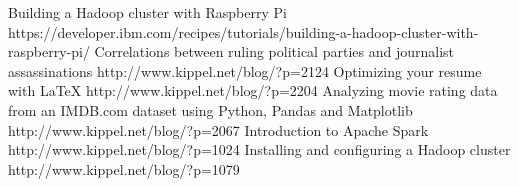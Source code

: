 %
%
%


\begin{publications}
    \publication
        {Building a Hadoop cluster with Raspberry Pi}
        {https://developer.ibm.com/recipes/tutorials/building-a-hadoop-cluster-with-raspberry-pi/}
    \publication
        {Correlations between ruling political parties and journalist assassinations}
        {http://www.kippel.net/blog/?p=2124}
    \publication
        {Optimizing your resume with LaTeX}
        {http://www.kippel.net/blog/?p=2204}
    \publication
        {Analyzing movie rating data from an IMDB.com dataset using Python, Pandas and Matplotlib}
        {http://www.kippel.net/blog/?p=2067}
    \publication
        {Introduction to Apache Spark}
        {http://www.kippel.net/blog/?p=1024}
    \publication
        {Installing and configuring a Hadoop cluster}
        {http://www.kippel.net/blog/?p=1079}
\end{publications}